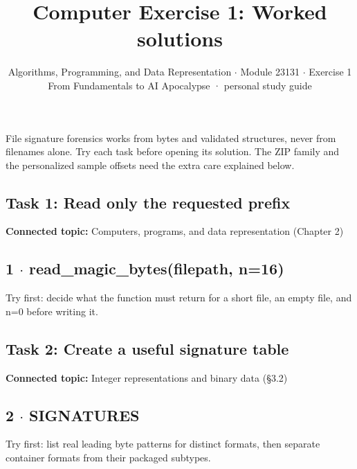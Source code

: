 \documentclass[11pt]{article}
\title{\sffamily\bfseries\color{FAUblue}Computer Exercise 1: Worked solutions}
\author{Algorithms, Programming, and Data Representation \ensuremath{\cdot} Module 23131 \ensuremath{\cdot} Exercise 1\\[2pt]\small From Fundamentals to AI Apocalypse · personal study guide}
\date{}
\begin{document}
\maketitle
\begingroup\footnotesize\setlength{\parskip}{0pt}\tableofcontents\endgroup
\clearpage

{\large File signature forensics works from bytes and validated structures, never from filenames alone. Try each task before opening its solution. The ZIP family and the personalized sample offsets need the extra care explained below.}


\begin{keepsection}
\section{Task 1: Read only the requested prefix}

\textbf{Connected topic:} Computers, programs, and data representation (Chapter 2)

\begin{keepsection}
\subsection{1 \ensuremath{\cdot} read\_magic\_bytes(filepath, n=16)}

Try first: decide what the function must return for a short file, an empty file, and n=0 before writing it.

\end{keepsection}
\end{keepsection}

\begin{keepsection}
\section{Task 2: Create a useful signature table}

\textbf{Connected topic:} Integer representations and binary data (§3.2)

\begin{keepsection}
\subsection{2 \ensuremath{\cdot} SIGNATURES}

Try first: list real leading byte patterns for distinct formats, then separate container formats from their packaged subtypes.

\end{keepsection}
\end{keepsection}
\end{document}
